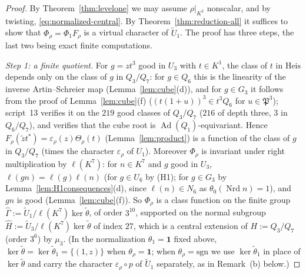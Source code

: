 \documentclass[11pt]{article}
\newcommand{\Nrd}{\operatorname{Nrd}}
\newcommand{\Ad}{\operatorname{Ad}}
\newcommand{\tU}{\widetilde U}
\newcommand{\tth}{\widetilde\theta}
\newcommand{\Pfr}{\mathfrak P}
\theoremstyle{plain}
\theoremstyle{definition}
\begin{document}
\begin{proof}
By Theorem~\ref{thm:levelone} we may assume $\rho|_{K^2}$ nonscalar, and
by twisting, \eqref{eq:normalized-central}.  By
Theorem~\ref{thm:reduction-all} it suffices to show that
$\Phi_\rho=\Phi_1F_\rho$ is a virtual character of $\tU_1$.  The proof
has three steps, the last two being exact finite computations.

\emph{Step 1: a finite quotient.}  For $g=zt^3$ good in $U_3$ with
$t\in K^1$, the class of $t$ in $\mathrm{Heis}$ depends only on the
class of $g$ in $Q_3/Q_7$: for $g\in Q_6$ this is the linearity of the
inverse Artin--Schreier map (Lemma~\ref{lem:cube}(d)), and for
$g\in G_3$ it follows from the proof of Lemma~\ref{lem:cube}(f)
($(t(1+u))^3\in t^3Q_6$ for $u\in\Pfr^3$); script~13 verifies it on
the $219$ good classes of $Q_3/Q_7$ ($216$ of depth three, $3$ in
$Q_6/Q_7$), and verifies that the cube root is $\Ad(Q_1)$-equivariant.
Hence $F_\rho(\tilde zt^*)=\varepsilon_\rho(z)\Theta_\rho(t)$
(Lemma~\ref{lem:product}) is a function of the class of $g$ in
$Q_3/Q_7$ (times the character $\varepsilon_\rho$ of $U_1$).  Moreover
$\Phi_\rho$ is invariant under right multiplication by $\ell(K^7)$: for
$n\in K^7$ and $g$ good in $U_3$, $\ell(gn)=\ell(g)\ell(n)$ (for
$g\in U_6$ by (H1); for $g\in G_3$ by Lemma~\ref{lem:H1consequences}(d),
since $\ell(n)\in N_6$ as $\theta_0(\Nrd n)=1$), and $gn$ is good
(Lemma~\ref{lem:cube}(f)).  So $\Phi_\rho$ is a class function on the
finite group $\hat\Gamma:=\tU_1/\ell(K^7)\ker\tth$, of order $3^{10}$,
supported on the normal subgroup $\hat H:=\tU_3/\ell(K^7)\ker\tth$ of
index $27$, which is a central extension of $H:=Q_3/Q_7$ (order $3^6$)
by $\mu_3$.  (In the normalization $\theta_1=\mathbf1$ fixed above,
$\ker\tth=\ker\tth_1=\{(1,z)\}$ when $\theta_\rho=\mathbf1$; when
$\theta_\rho=\mathrm{sgn}$ we use $\ker\tth_1$ in place of $\ker\tth$ and
carry the character $\varepsilon_\rho\circ p$ of $\tU_1$ separately, as
in Remark~(b) below.)


\end{proof}
\end{document}
